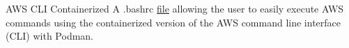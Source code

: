 \datedsubsection{}
{AWS CLI Containerized}{}
{A .bashrc \href{https://github.com/JacobArchambault/aws-cli-container-shortcut-with-podman}{file} allowing the user to easily execute AWS commands using the containerized version of the AWS command line interface (CLI) with Podman.}
